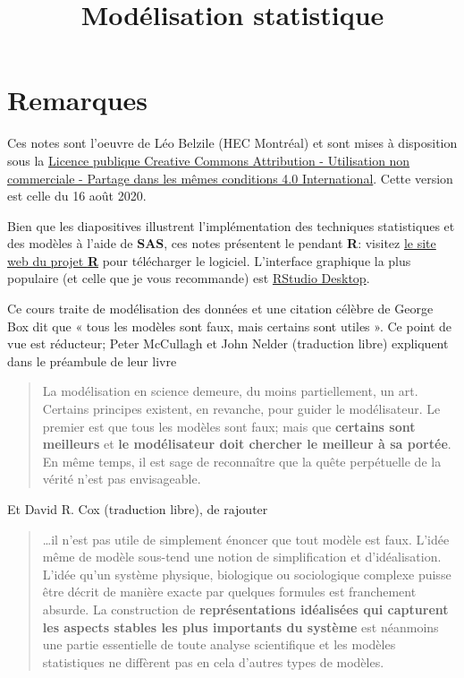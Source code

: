 \documentclass[
  11pt,
  letterpaper,
]{book}
\title{Modélisation statistique}
\author{}
\date{\vspace{-2.5em}}
\let\oldhref\href
\renewcommand{\href}[2]{#2\footnote{\url{#1}}}
\theoremstyle{definition}
\theoremstyle{definition}
\theoremstyle{definition}
\theoremstyle{remark}
\begin{document}
\maketitle

\let\href\oldhref

{
\setcounter{tocdepth}{1}
\tableofcontents
}
\hypertarget{remarques}{%
\chapter*{Remarques}\label{remarques}}

Ces notes sont l'oeuvre de Léo Belzile (HEC Montréal) et sont mises à disposition sous la \href{https://creativecommons.org/licenses/by-nc-sa/4.0/legalcode.fr}{Licence publique Creative Commons Attribution - Utilisation non commerciale - Partage dans les mêmes conditions 4.0 International}. Cette version est celle du 16 août 2020.

Bien que les diapositives illustrent l'implémentation des techniques statistiques et des modèles à l'aide de \textbf{SAS}, ces notes présentent le pendant \textbf{R}: visitez \href{https://cran.r-project.org/}{le site web du projet \textbf{R}} pour télécharger le logiciel. L'interface graphique la plus populaire (et celle que je vous recommande) est \href{https://www.rstudio.com/products/rstudio/download/}{RStudio Desktop}.

Ce cours traite de modélisation des données et une citation célèbre de George Box dit que « tous les modèles sont faux, mais certains sont utiles ». Ce point de vue est réducteur; Peter McCullagh et John Nelder (traduction libre) expliquent dans le préambule de leur livre

\begin{quote}
La modélisation en science demeure, du moins partiellement, un art. Certains principes existent, en revanche, pour guider le modélisateur. Le premier est que tous les modèles sont faux; mais que \textbf{certains sont meilleurs} et \textbf{le modélisateur doit chercher le meilleur à sa portée}. En même temps, il est sage de reconnaître que la quête perpétuelle de la vérité n'est pas envisageable.
\end{quote}

Et David R. Cox (traduction libre), de rajouter

\begin{quote}
\ldots il n'est pas utile de simplement énoncer que tout modèle est faux. L'idée même de modèle sous-tend une notion de simplification et d'idéalisation. L'idée qu'un système physique, biologique ou sociologique complexe puisse être décrit de manière exacte par quelques formules est franchement absurde. La construction de \textbf{représentations idéalisées qui capturent les aspects stables les plus importants du système} est néanmoins une partie essentielle de toute analyse scientifique et les modèles statistiques ne diffèrent pas en cela d'autres types de modèles.
\end{quote}
\end{document}
